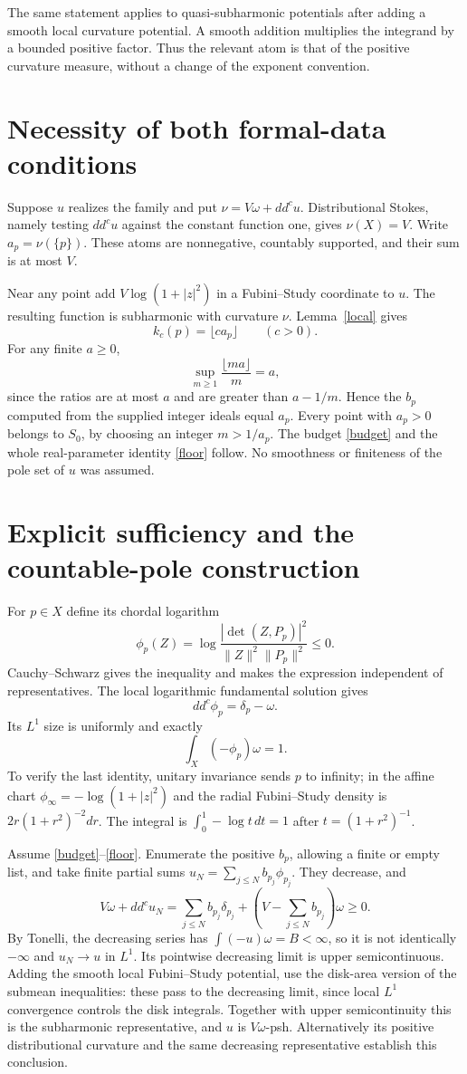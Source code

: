 \documentclass[11pt]{article}
\begin{document}
The same statement applies to quasi-subharmonic potentials after adding a smooth local curvature potential. A smooth addition multiplies the integrand by a bounded positive factor. Thus the relevant atom is that of the positive curvature measure, without a change of the exponent convention.

\section{Necessity of both formal-data conditions}
Suppose $u$ realizes the family and put $\nu=V\omega+dd^cu$. Distributional Stokes, namely testing $dd^cu$ against the constant function one, gives $\nu(X)=V$. Write $a_p=\nu(\{p\})$. These atoms are nonnegative, countably supported, and their sum is at most $V$.

Near any point add $V\log(1+|z|^2)$ in a Fubini--Study coordinate to $u$. The resulting function is subharmonic with curvature $\nu$. Lemma~\ref{local} gives
\[
 k_c(p)=\lfloor c a_p\rfloor \qquad(c>0).
\]
For any finite $a\geq0$,
\[
 \sup_{m\geq1}\frac{\lfloor ma\rfloor}{m}=a,
\]
since the ratios are at most $a$ and are greater than $a-1/m$. Hence the $b_p$ computed from the supplied integer ideals equal $a_p$. Every point with $a_p>0$ belongs to $S_0$, by choosing an integer $m>1/a_p$. The budget \eqref{budget} and the whole real-parameter identity \eqref{floor} follow. No smoothness or finiteness of the pole set of $u$ was assumed.

\section{Explicit sufficiency and the countable-pole construction}
For $p\in X$ define its chordal logarithm
\[
 \phi_p(Z)=\log\frac{|\det(Z,P_p)|^2}{\|Z\|^2\|P_p\|^2}\leq0.
\]
Cauchy--Schwarz gives the inequality and makes the expression independent of representatives. The local logarithmic fundamental solution gives
\[
 dd^c\phi_p=\delta_p-\omega.
\]
Its $L^1$ size is uniformly and exactly
\[
 \int_X(-\phi_p)\omega=1.
\]
To verify the last identity, unitary invariance sends $p$ to infinity; in the affine chart $\phi_\infty=-\log(1+|z|^2)$ and the radial Fubini--Study density is $2r(1+r^2)^{-2}dr$. The integral is $\int_0^1-\log t\,dt=1$ after $t=(1+r^2)^{-1}$.

Assume \eqref{budget}--\eqref{floor}. Enumerate the positive $b_p$, allowing a finite or empty list, and take finite partial sums $u_N=\sum_{j\leq N}b_{p_j}\phi_{p_j}$. They decrease, and
\[
 V\omega+dd^cu_N=\sum_{j\leq N}b_{p_j}\delta_{p_j}
 +\left(V-\sum_{j\leq N}b_{p_j}\right)\omega\geq0.
\]
By Tonelli, the decreasing series has $\int(-u)\omega=B<\infty$, so it is not identically $-\infty$ and $u_N\to u$ in $L^1$. Its pointwise decreasing limit is upper semicontinuous. Adding the smooth local Fubini--Study potential, use the disk-area version of the submean inequalities: these pass to the decreasing limit, since local $L^1$ convergence controls the disk integrals. Together with upper semicontinuity this is the subharmonic representative, and $u$ is $V\omega$-psh. Alternatively its positive distributional curvature and the same decreasing representative establish this conclusion.
\end{document}
